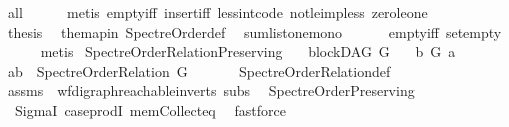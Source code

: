 \begin{isabellebody}
\ all{}{}\isanewline
\ \ \ \ \isamarkupfalse%
\ {\isacharparenleft}{\kern0pt}metis\ empty{\isacharunderscore}{\kern0pt}iff\ insert{\isacharunderscore}{\kern0pt}iff\ less{\isacharunderscore}{\kern0pt}int{\isacharunderscore}{\kern0pt}code{\isacharparenleft}{\kern0pt}{}{\isacharparenright}{\kern0pt}\ not{\isacharunderscore}{\kern0pt}le{\isacharunderscore}{\kern0pt}imp{\isacharunderscore}{\kern0pt}less\ zero{\isacharunderscore}{\kern0pt}le{\isacharunderscore}{\kern0pt}one{\isacharparenright}{\kern0pt}\ \isanewline
\ \ \isamarkupfalse%
\ \isamarkupfalse%
\ {\isacharquery}{\kern0pt}thesis\ \isamarkupfalse%
\ the{\isacharunderscore}{\kern0pt}map{\isacharunderscore}{\kern0pt}in\ Spectre{\isacharunderscore}{\kern0pt}Order{\isacharunderscore}{\kern0pt}def\ \isamarkupfalse%
\ sumlist{\isacharunderscore}{\kern0pt}one{\isacharunderscore}{\kern0pt}mono\isanewline
\ \ \ \ \ \ empty{\isacharunderscore}{\kern0pt}iff\ set{\isacharunderscore}{\kern0pt}empty\isanewline
\ \ \ \ \isamarkupfalse%
\ {\isacharparenleft}{\kern0pt}metis{\isacharparenright}{\kern0pt}\isanewline
{}\isamarkupfalse%
%
\endisatagproof
{\isafoldproof}%
%
\isadelimproof
\isanewline
%
\endisadelimproof
\isanewline
\isanewline
{}\isamarkupfalse%
\ Spectre{\isacharunderscore}{\kern0pt}Order{\isacharunderscore}{\kern0pt}Relation{\isacharunderscore}{\kern0pt}Preserving{\isacharcolon}{\kern0pt}\isanewline
\ \ \ {\isachardoublequoteopen}blockDAG\ G{\isachardoublequoteclose}\isanewline
\ \ \ {\isachardoublequoteopen}b\ {\isasymrightarrow}\isactrlsup {\isacharplus}{\kern0pt}\isactrlbsub G\isactrlesub \ a{\isachardoublequoteclose}\isanewline
{}\ {\isachardoublequoteopen}{\isacharparenleft}{\kern0pt}a{\isacharcomma}{\kern0pt}b{\isacharparenright}{\kern0pt}\ {\isasymin}\ {\isacharparenleft}{\kern0pt}Spectre{\isacharunderscore}{\kern0pt}Order{\isacharunderscore}{\kern0pt}Relation\ G{\isacharparenright}{\kern0pt}{\isachardoublequoteclose}\ \ \ \isanewline
%
\isadelimproof
\ \ %
\endisadelimproof
%
\isatagproof
{}\isamarkupfalse%
\ Spectre{\isacharunderscore}{\kern0pt}Order{\isacharunderscore}{\kern0pt}Relation{\isacharunderscore}{\kern0pt}def\isanewline
\ \ \isamarkupfalse%
\ assms\ \ wf{\isacharunderscore}{\kern0pt}digraph{\isachardot}{\kern0pt}reachable{}{\isacharunderscore}{\kern0pt}in{\isacharunderscore}{\kern0pt}verts\ subs\isanewline
\ \ Spectre{\isacharunderscore}{\kern0pt}Order{\isacharunderscore}{\kern0pt}Preserving\isanewline
\ \ SigmaI\ case{\isacharunderscore}{\kern0pt}prodI\ mem{\isacharunderscore}{\kern0pt}Collect{\isacharunderscore}{\kern0pt}eq\ \isamarkupfalse%
\ fastforce%
\endisatagproof
{\isafoldproof}%
%
\isadelimproof
\ \isanewline
%
\endisadelimproof
%
\isadelimtheory
%
\endisadelimtheory
%
\isatagtheory
{}\isamarkupfalse%
%
\endisatagtheory
{\isafoldtheory}%
%
\isadelimtheory
%
\endisadelimtheory
%
\end{isabellebody}%
